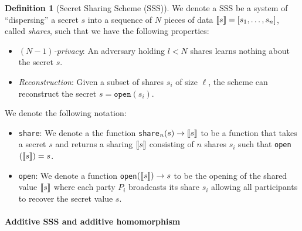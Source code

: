 \documentclass[11pt]{report}
\theoremstyle{definition}
\newtheorem{definition}{Definition}[section]
\theoremstyle{plain}
\begin{document}
\begin{definition}[Secret Sharing Scheme (SSS)]\label{def:ss-share}
  We denote a SSS be a system of ``dispersing'' a secret $s$ into a sequence of $N$ pieces of data $\llbracket s \rrbracket = [s_1, \dots, s_n]$, called \emph{shares}, such that we have the following properties:
  \begin{itemize}[parsep=0pt, itemsep=0pt]
    \item \textit{$(N-1)$-privacy}: An adversary holding $l < N$ shares learns nothing about the secret $s$.
    \item \textit{Reconstruction}: Given a subset of shares $s_i$ of size $\ell$, the scheme can reconstruct the secret $s = \texttt{open}(s_i)$.
  \end{itemize}
  We denote the following notation:
  \begin{itemize}
    \item \texttt{share}: We denote a the function \texttt{share}$_n(s) \rightarrow \llbracket s \rrbracket$ to be a function that takes a secret $s$ and returns a sharing $\llbracket s \rrbracket$ consisting of $n$ shares $s_i$ such that \texttt{open}$(\llbracket s \rrbracket) = s$.
    \item \texttt{open}: We denote a function \texttt{open}$(\llbracket s \rrbracket) \rightarrow s$ to be the opening of the shared value $\llbracket s \rrbracket$ where each party $P_i$ broadcasts its share $s_i$ allowing all participants to recover the secret value $s$.
  \end{itemize}
\end{definition}

\paragraph{Additive SSS and additive homomorphism}\label{sec:additive-sss}
\end{document}
